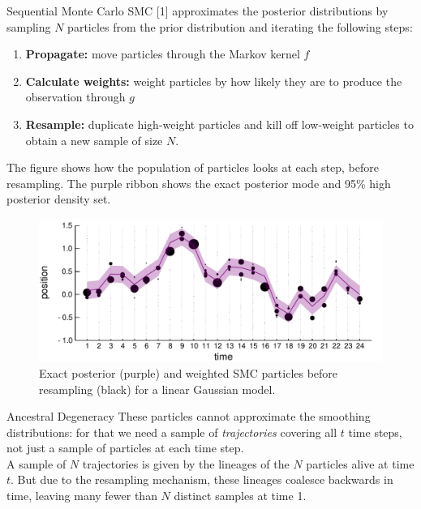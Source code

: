 \documentclass[final, 12pt]{beamer}
\newlength{\colwidth}
\begin{document}
\begin{frame}
\begin{columns}
\begin{column}{\colwidth}
\begin{block}{Sequential Monte Carlo}
SMC [1] approximates the posterior distributions by sampling $N$ particles from the prior distribution and iterating the following steps:
\begin{enumerate}
\item \textbf{Propagate:} move particles through the Markov kernel $f$
\item \textbf{Calculate weights:} weight particles by how likely they are to produce the observation through $g$
\item \textbf{Resample:} duplicate high-weight particles and kill off low-weight particles to obtain a new sample of size $N$.
\end{enumerate}

\vspace*{10pt}

The figure shows how the population of particles looks at each step, before resampling. The purple ribbon shows the exact posterior mode and 95\% high posterior density set.
\begin{figure}
\includegraphics[width=\colwidth]{../smc_kalman_3.pdf}
\caption{Exact posterior (purple) and weighted SMC particles before resampling (black) for a linear Gaussian model.}
\end{figure}
\end{block}

\begin{block}{Ancestral Degeneracy}
These particles cannot approximate the smoothing distributions: for that we need a sample of \emph{trajectories} covering all $t$ time steps, not just a sample of particles at each time step.\\[10pt]

A sample of $N$ trajectories is given by the lineages of the $N$ particles alive at time $t$.
But due to the resampling mechanism, these lineages coalesce backwards in time, leaving many fewer than $N$ distinct samples at time 1. 


\end{block}
\end{column}
\end{columns}
\end{frame}
\end{document}
